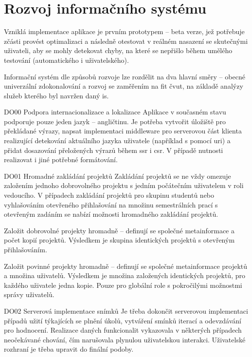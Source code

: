 \chapter{Rozvoj informačního systému}

Vzniklá implementace aplikace je prvním prototypem -- beta verze, jež potřebuje zčásti provést optimalizaci a následně otestovat v reálném nasazení se skutečnými uživateli, aby se mohly detekovat chyby, na které se nepřišlo během umělého testování (automatického i uživatelského). 

Informační systém dle způsobů rozvoje lze rozdělit na dva hlavní směry -- obecné univerzální zdokonalování a rozvoj se zaměřením na \gls{fit} \gls{čvut}, na základě analýzy služeb kterého byl navržen daný \gls{is}. 

\begin{dl}   

   \item[DO00 Podpora internacionalizace a lokalizace]
   Aplikace v současném stavu podporuje pouze jeden jazyk -- angličtinu. Je potřeba vytvořit úložiště pro překládané výrazy, napsat implementaci middleware pro serverovou část klienta realizující detekování aktuálního jazyka uživatele (například s pomocí \gls{uri}) a přidat dosazování přeložených výrazů během \gls{ssr} i \gls{csr}. V případě nutnosti realizovat i jiné potřebné formátování.
    
   \item[DO01 Hromadné zakládání projektů] 
   Zakládání projektů se ne vždy omezuje založením jednoho dobrovolného projektu s jedním počátečním uživatelem v roli vedoucího. V případech zakládání projektů pro skupinu studentů nebo vyhlašováním otevřeného přihlašování na množinu semestrálních prací s otevřeným zadáním se nabízí možnosti hromadného zakládání projektů.

   Založit dobrovolné projekty hromadně -- definují se společné metainformace a počet kopií projektů. Výsledkem je skupina identických projektů s otevřeným přihlašováním.

   Založit povinné projekty hromadně -- definují se společné metainformace projektů a množina uživatelů. Výsledkem je množina založených identických projektů, pro každého uživatele jedna kopie. Pouze pro globální role s pokročilými možnostmi správy uživatelů.

   \item[DO02 Serverová implementace snímků] 
   Je třeba dokončit serverovou implementaci případů užití týkajících se plnění úkolů, vytváření smínků iterací a odevzdávání pro hodnocení. Realizace daných funkcionalit vykazovala v některých případech neočekávané chování, čím narušovala plynulou uživatelskou interakci. Uživatelské rozhraní je třeba upravit do finální podoby.


\end{dl}
